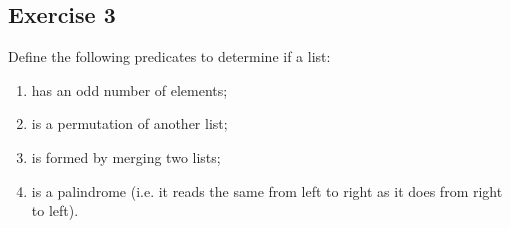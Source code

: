 \documentclass [11pt, a4wide, twoside]{article}
\begin{document}

\subsection*{Exercise 3}
Define the following predicates to determine if a list:
\begin{enumerate}
\renewcommand{\theenumi}{\alph{enumi}}

\item has an odd number of elements;

\item is a permutation of another list;

\item is formed by merging two lists;

\item is a palindrome (i.e. it reads the same from left to right as it does from right to left).
\end{enumerate}


%
%
%
%
%
\end{document}
